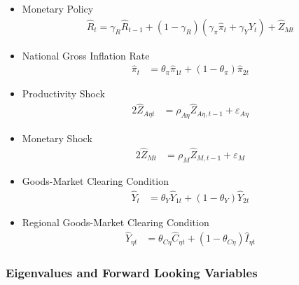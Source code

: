 \documentclass[../thesis.tex]{subfiles}
\begin{document}
{\begin{itemize}
			\item Monetary Policy
			\begin{align}
				\hat{R}_t = \gamma_{R} \hat{R}_{t-1} + (1-\gamma_{R})(\gamma_{\pi} \hat{\pi}_t + \gamma_{Y} \hat{Y}_t) + \hat{Z}_{Mt} \label{eq_v2:reg-ll-monetary-policy}
			\end{align}
			
			\item National Gross Inflation Rate
			\begin{align}
				\hat{\pi}_{t} &= \theta_{\pi} \hat{\pi}_{1t} + (1 - \theta_{\pi}) \hat{\pi}_{2t} \label{eq_v2:reg-gross-inflation-rate-ll}
			\end{align}
			
			\item Productivity Shock
			\begin{alignat}{2}
				\hat{Z}_{A\eta t} &= \rho_{A\eta} \hat{Z}_{A\eta, t-1} + \varepsilon_{A\eta} \label{eq_v2:reg-ll-productivity-shock}
			\end{alignat}
			
			\item Monetary Shock
			\begin{alignat}{2}
				\hat{Z}_{Mt} &= \rho_M \hat{Z}_{M,t-1} + \varepsilon_{M} \label{eq_v2:reg-ll-monetary-shock}
			\end{alignat}
			
			\item Goods-Market Clearing Condition
			\begin{align}
				\hat{Y}_{t} &= \theta_{Y} \hat{Y}_{1t} + (1-\theta_{Y}) \hat{Y}_{2t} \label{eq_v2:reg-ll-market-clearing-condition-Yt-3}
			\end{align}
			
			\item Regional Goods-Market Clearing Condition
			\begin{align}
				\hat{Y}_{\eta t} &= \theta_{C\eta} \hat{C}_{\eta t} + (1 - \theta_{C\eta}) \hat{I}_{\eta t} \label{eq_v2:reg-ll-total-yn-2}
			\end{align}
			
	\end{itemize}
	
} %


\subsubsection{Eigenvalues and Forward Looking Variables}
\end{document}
